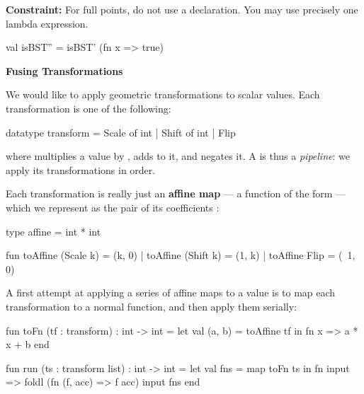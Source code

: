 \documentclass[addpoints,12pt, answers]{exam}
\newenvironment{constraint}{\color{constraint_color}\textbf{Constraint:}}{}
\begin{document}
\begin{questions}
\begin{parts}
  \begin{constraint}
    For full points, do not use a  declaration.
    You may use precisely one lambda expression.
  \end{constraint}

  \begin{solutionorbox}[20em]
    \begin{codeblock}
      val isBST'' = isBST' (fn x => true)
    \end{codeblock}
  \end{solutionorbox}
\end{parts}

\newpage
{}

\textbf{Fusing Transformations}

We would like to apply geometric transformations to scalar values.
Each transformation is one of the following:

\begin{codeblock}
  datatype transform = Scale of int | Shift of int | Flip
\end{codeblock}

where  multiplies a value by ,  adds
 to it, and  negates it. A  is thus a
\textit{pipeline}: we apply its transformations in order.

Each transformation is really just an \textbf{affine map} --- a function of the
form  --- which we represent as the pair of its
coefficients :

\begin{codeblock}
  type affine = int * int

  fun toAffine (Scale k) = (k, 0)
    | toAffine (Shift k) = (1, k)
    | toAffine Flip      = (~1, 0)
\end{codeblock}

A first attempt at applying a series of affine maps to a value is to map each transformation to a normal
function, and then apply them serially:

\begin{codeblock}
  fun toFn (tf : transform) : int -> int =
    let
      val (a, b) = toAffine tf
    in
      fn x => a * x + b
    end

  fun run (ts : transform list) : int -> int =
    let
      val fns = map toFn ts
    in
      fn input => foldl (fn (f, acc) => f acc) input fns
    end
\end{codeblock}


\end{questions}
\end{document}
